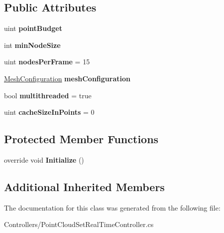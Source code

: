 \subsection*{Public Attributes}
\begin{DoxyCompactItemize}
\item 
\mbox{\label{class_controllers_1_1_point_cloud_set_real_time_controller_a549628d8ed3f25f10c3b76dbae85f21f}} 
uint {\bfseries point\+Budget}
\item 
\mbox{\label{class_controllers_1_1_point_cloud_set_real_time_controller_a9f1a28c90565a0fc6682d696fb9a69f8}} 
int {\bfseries min\+Node\+Size}
\item 
\mbox{\label{class_controllers_1_1_point_cloud_set_real_time_controller_adc4813fd0699df3a3f346cf1f7b5fed5}} 
uint {\bfseries nodes\+Per\+Frame} = 15
\item 
\mbox{\label{class_controllers_1_1_point_cloud_set_real_time_controller_a8f86af88e750db2c7fea237ce00eaa5d}} 
\hyperlink{class_object_creation_1_1_mesh_configuration}{Mesh\+Configuration} {\bfseries mesh\+Configuration}
\item 
\mbox{\label{class_controllers_1_1_point_cloud_set_real_time_controller_aa38ef6c83b9ceb3ea8389164c5c05e77}} 
bool {\bfseries multithreaded} = true
\item 
\mbox{\label{class_controllers_1_1_point_cloud_set_real_time_controller_aa957e5447cd6ec2bc1c387bbb65a90ad}} 
uint {\bfseries cache\+Size\+In\+Points} = 0
\end{DoxyCompactItemize}
\subsection*{Protected Member Functions}
\begin{DoxyCompactItemize}
\item 
\mbox{\label{class_controllers_1_1_point_cloud_set_real_time_controller_a201cc0a4cf300d304ee090d138fc8637}} 
override void {\bfseries Initialize} ()
\end{DoxyCompactItemize}
\subsection*{Additional Inherited Members}


The documentation for this class was generated from the following file\+:\begin{DoxyCompactItemize}
\item 
Controllers/Point\+Cloud\+Set\+Real\+Time\+Controller.\+cs\end{DoxyCompactItemize}
